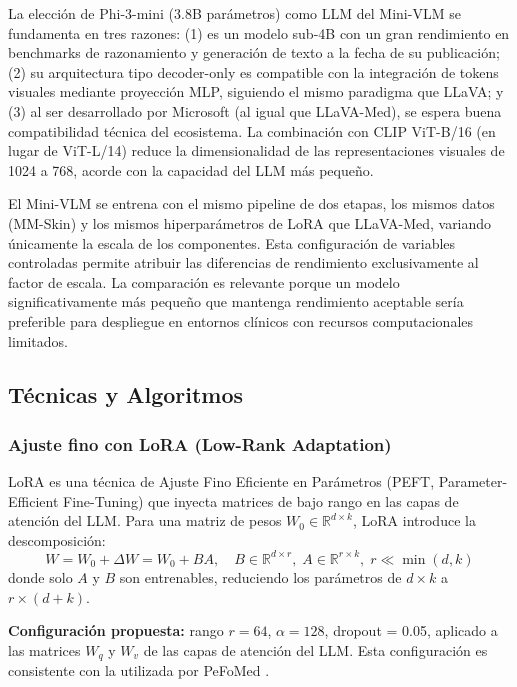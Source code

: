 \documentclass[11pt, a4paper]{article}
\begin{document}
La elección de Phi-3-mini (3.8B parámetros) \cite{abdin_phi3_2024} como LLM del Mini-VLM se fundamenta en tres razones: (1) es un modelo sub-4B con un gran rendimiento en benchmarks de razonamiento y generación de texto a la fecha de su publicación; (2) su arquitectura tipo decoder-only es compatible con la integración de tokens visuales mediante proyección MLP, siguiendo el mismo paradigma que LLaVA; y (3) al ser desarrollado por Microsoft (al igual que LLaVA-Med), se espera buena compatibilidad técnica del ecosistema. La combinación con CLIP ViT-B/16 (en lugar de ViT-L/14) reduce la dimensionalidad de las representaciones visuales de 1024 a 768, acorde con la capacidad del LLM más pequeño.

El Mini-VLM se entrena con el mismo pipeline de dos etapas, los mismos datos (MM-Skin) y los mismos hiperparámetros de LoRA que LLaVA-Med, variando únicamente la escala de los componentes. Esta configuración de variables controladas permite atribuir las diferencias de rendimiento exclusivamente al factor de escala. La comparación es relevante porque un modelo significativamente más pequeño que mantenga rendimiento aceptable sería preferible para despliegue en entornos clínicos con recursos computacionales limitados. 

\subsection{Técnicas y Algoritmos}

\subsubsection{Ajuste fino con LoRA (Low-Rank Adaptation)}

LoRA \cite{hu_lora_2021} es una técnica de Ajuste Fino Eficiente en Parámetros (PEFT, Parameter-Efficient Fine-Tuning) que inyecta matrices de bajo rango en las capas de atención del LLM. Para una matriz de pesos $W_0 \in \mathbb{R}^{d \times k}$, LoRA introduce la descomposición:
\begin{equation}
    W = W_0 + \Delta W = W_0 + BA, \quad B \in \mathbb{R}^{d \times r}, \; A \in \mathbb{R}^{r \times k}, \; r \ll \min(d,k)
\end{equation}
donde solo $A$ y $B$ son entrenables, reduciendo los parámetros de $d \times k$ a $r \times (d + k)$.

\textbf{Configuración propuesta:} rango $r = 64$, $\alpha = 128$, dropout = 0.05, aplicado a las matrices $W_q$ y $W_v$ de las capas de atención del LLM. Esta configuración es consistente con la utilizada por PeFoMed \cite{he_pefomed_2024}.
\end{document}
